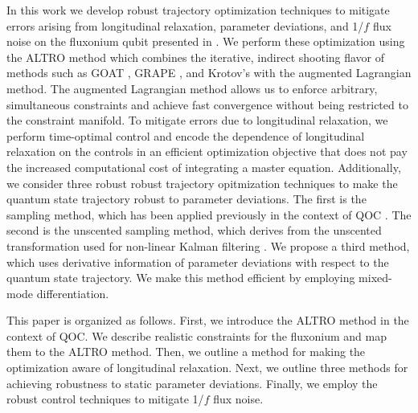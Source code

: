 In this work we develop robust trajectory optimization techniques to mitigate
errors arising from longitudinal relaxation, parameter deviations, and 1/$f$ flux noise
on the fluxonium qubit presented in \cite{zhang2020universal}. We perform these optimization using the ALTRO
method \cite{howell2019altro} which combines the iterative, indirect shooting
flavor of methods such as GOAT \cite{machnes2015gradient}, GRAPE
\cite{khaneja2005optimal, leung2017speedup}, and Krotov's \cite{goerz2019krotov}
with the augmented Lagrangian method. The augmented Lagrangian method
allows us to enforce arbitrary, simultaneous constraints and achieve
fast convergence without being restricted to the constraint
manifold. To mitigate errors due to longitudinal
relaxation, we perform time-optimal control and
encode the dependence of longitudinal relaxation
on the controls in an efficient optimization objective that does
not pay the increased computational cost of integrating a master equation.
Additionally, we consider three robust
robust trajectory opitmization techniques to make the
quantum state trajectory robust to parameter deviations.
The first is the sampling method, which has been applied
previously in the context of QOC
\cite{carvalho2020error, reinhold2019controlling, rembold2020introduction}.
The second is the unscented sampling
method, which derives from the unscented transformation used
for non-linear Kalman filtering
\cite{howell2020direct, julier2004unscented, lee2013sigma, manchester2016derivative}.
We propose a third method, which uses derivative information
of parameter deviations with respect to the quantum state trajectory.
We make this method efficient by employing mixed-mode differentiation.

This paper is organized as follows.
First, we introduce the ALTRO method in the context of QOC.
We describe realistic constraints for the fluxonium and
map them to the ALTRO method. Then, we
outline a method for making the optimization aware of longitudinal
relaxation. Next, we outline three methods for achieving
robustness to static parameter deviations. Finally,
we employ the robust control techniques to mitigate 1/$f$ flux noise.
